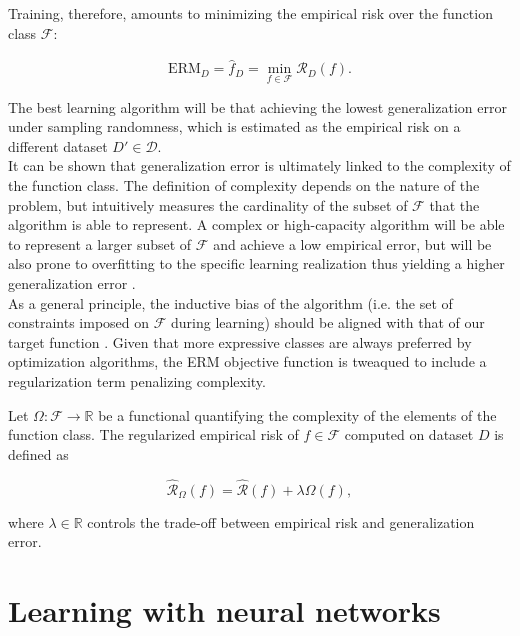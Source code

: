 Training, therefore, amounts to minimizing the empirical risk over the function class $\mathcal{F}$:

$$
\text{ERM}_D = \hat{f}_D = \min_{f \in \mathcal{F}} \hat{\mathcal{R}}_D(f).
$$

The best learning algorithm will be that achieving the lowest generalization error
under sampling randomness, which is estimated as the empirical risk 
on a different dataset $D' \in \mathcal{D}$. \\

It can be shown that generalization 
error is ultimately linked to the complexity of the function class. 
The definition of complexity depends 
on the nature of the problem, but intuitively measures the cardinality of the
subset of $\mathcal{F}$ that the algorithm is able to represent. A complex or 
high-capacity algorithm will be able to represent a larger subset 
of $\mathcal{F}$ and achieve a low empirical error, but will be also
prone to overfitting to the specific learning realization thus yielding 
a higher generalization error \cite{n.vapnikNatureStatisticalLearning2000}. \\

As a general principle, the inductive bias of the algorithm (i.e. the set of constraints imposed on $\mathcal{F}$ during learning) should be aligned with
that of our target function
\cite{jimenezInductiveBiasDeep}. 
Given that more expressive classes are always preferred by optimization algorithms, the ERM
objective function is tweaqued to include a regularization term penalizing complexity.

\begin{definition}\label{def:rrm}
    Let $\Omega: \mathcal{F} \to \mathbb{R}$ be a functional quantifying the complexity
    of the elements of the function class. The regularized empirical risk of $f \in \mathcal{F}$
    computed on dataset $D$ is defined as

    $$
    \hat{\mathcal{R}}_{\Omega}(f)=\hat{\mathcal{R}}(f) + \lambda \Omega(f),
    $$

    where $\lambda \in \mathbb{R}$ controls the trade-off between empirical risk and generalization error.

\end{definition}



\section{Learning with neural networks}

